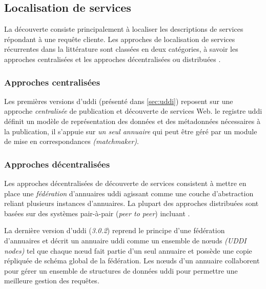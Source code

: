 \subsection{Localisation de services}
\label{sec:ws-localisation}
La découverte consiste principalement à localiser les descriptions de
services répondant à une requête cliente. Les approches de
localisation de services récurrentes dans la littérature sont classées
en deux catégories, à savoir les approches centralisées et les
approches décentralisées ou distribuées \cite{garofalakis2004web}.

    \subsubsection{Approches centralisées}
    \label{sec:ws-localisation-centr}
    Les premières versions d'\acrshort{uddi} \cite{clement2004uddi}
    (présenté dans \ref{sec:uddi}) reposent sur une approche
    \textit{centralisée} de publication et découverte de services
    Web. le registre \acrshort{uddi} définit un modèle de
    représentation des données et des métadonnées nécessaires à la
    publication, il s'appuie sur \textit{un seul annuaire} qui peut être
    géré par un module de mise en correspondances
    \textit{(matchmaker)}.

    \subsubsection{Approches décentralisées}
    \label{sec:ws-localisation-distr}
    Les approches décentralisées de découverte de services
    \cite{rompothong2003query, sivashanmugam2004discovery,
      paolucci2003using, schmidt2004peer, verma2005meteor,
      sahin2005spider} consistent à mettre en place une
    \textit{fédération} d'annuaires \acrshort{uddi} agissant comme une
    couche d'abstraction reliant plusieurs instances d'annuaires. La
    plupart des approches distribuées sont basées sur des systèmes
    pair-à-pair (\textit{peer to peer}) incluant
    \cite{schmidt2004peer, verma2005meteor, sahin2005spider}.

    La dernière version d'\acrshort{uddi}
    \cite{oasis2005specification} (\textit{3.0.2}) reprend le principe
    d'une fédération d'annuaires et décrit un annuaire \acrshort{uddi}
    comme un ensemble de nœuds \textit{(UDDI nodes)} tel que chaque
    nœud fait partie d'un seul annuaire et possède une copie répliquée
    de schéma global de la fédération. Les nœuds d'un annuaire
    collaborent pour gérer un ensemble de structures de données
    \acrshort{uddi} pour permettre une meilleure gestion des requêtes.

